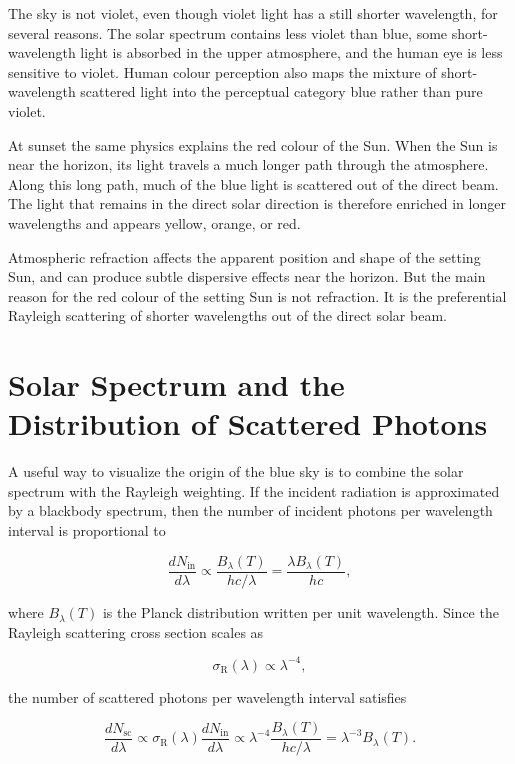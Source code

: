 \documentclass[11pt,a4paper]{article}
\begin{document}
The sky is not violet, even though violet light has a still shorter wavelength,
for several reasons. The solar spectrum contains less violet than blue, some
short-wavelength light is absorbed in the upper atmosphere, and the human eye
is less sensitive to violet. Human colour perception also maps the mixture of
short-wavelength scattered light into the perceptual category blue rather than
pure violet.

At sunset the same physics explains the red colour of the Sun. When the Sun is
near the horizon, its light travels a much longer path through the atmosphere.
Along this long path, much of the blue light is scattered out of the direct
beam. The light that remains in the direct solar direction is therefore
enriched in longer wavelengths and appears yellow, orange, or red.

Atmospheric refraction affects the apparent position and shape of the setting
Sun, and can produce subtle dispersive effects near the horizon. But the main
reason for the red colour of the setting Sun is not refraction. It is the
preferential Rayleigh scattering of shorter wavelengths out of the direct
solar beam.


\section{Solar Spectrum and the Distribution of Scattered Photons}

A useful way to visualize the origin of the blue sky is to combine the solar
spectrum with the Rayleigh weighting. If the incident radiation is approximated
by a blackbody spectrum, then the number of incident photons per wavelength
interval is proportional to

\begin{equation}
\frac{dN_{\mathrm{in}}}{d\lambda}
\propto
\frac{B_\lambda(T)}{hc/\lambda}
=
\frac{\lambda B_\lambda(T)}{hc},
\end{equation}

where \(B_\lambda(T)\) is the Planck distribution written per unit wavelength.
Since the Rayleigh scattering cross section scales as

\begin{equation}
\sigma_{\mathrm{R}}(\lambda)\propto \lambda^{-4},
\end{equation}

the number of scattered photons per wavelength interval satisfies

\begin{equation}
\frac{dN_{\mathrm{sc}}}{d\lambda}
\propto
\sigma_{\mathrm{R}}(\lambda)\frac{dN_{\mathrm{in}}}{d\lambda}
\propto
\lambda^{-4}\frac{B_\lambda(T)}{hc/\lambda}
=
\lambda^{-3}B_\lambda(T).
\end{equation}
\end{document}

